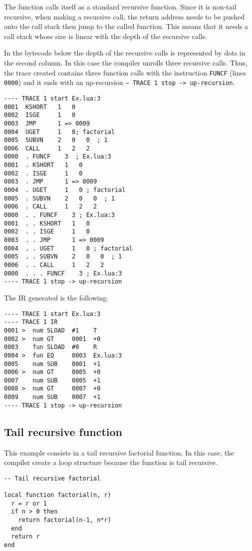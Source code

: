 \noindent
The function calls itself as a standard recursive function. Since it is non-tail recursive, when making a recursive call, the return address needs to be pushed onto the call stack then jump to the called function. This means that it needs a call stack whose size is linear with the depth of the recursive calls.

In the bytecode below the depth of the recursive calls is represented by dots in the second column. In this case the compiler unrolls three recursive calls. Thus, the trace created contains three function calls with the instruction \texttt{FUNCF} (lines \texttt{0000}) and it ends with an up-recursion \texttt{-- TRACE 1 stop -> up-recursion}.
\begin{multicols}{2}
\begin{lstlisting}[style=DumpStyle]
---- TRACE 1 start Ex.lua:3
0001  KSHORT   1   0
0002  ISGE     1   0
0003  JMP      1 => 0009
0004  UGET     1   0; factorial
0005  SUBVN    2   0   0  ; 1
0006  CALL     1   2   2
0000  . FUNCF    3  ; Ex.lua:3
0001  . KSHORT   1   0
0002  . ISGE     1   0
0003  . JMP      1 => 0009
0004  . UGET     1   0 ; factorial
0005  . SUBVN    2   0   0  ; 1
0006  . CALL     1   2   2
0000  . . FUNCF    3 ; Ex.lua:3
0001  . . KSHORT   1   0
0002  . . ISGE     1   0
0003  . . JMP      1 => 0009
0004  . . UGET     1   0 ; factorial
0005  . . SUBVN    2   0   0  ; 1
0006  . . CALL     1   2   2
0000  . . . FUNCF    3 ; Ex.lua:3
---- TRACE 1 stop -> up-recursion
\end{lstlisting}
\end{multicols}

\noindent
The IR generated is the following.

\begin{multicols}{2}
\begin{lstlisting}[style=DumpStyle]
---- TRACE 1 start Ex.lua:3
---- TRACE 1 IR
0001 >  num SLOAD  #1    T
0002 >  num GT     0001  +0  
0003    fun SLOAD  #0    R
0004 >  fun EQ     0003  Ex.lua:3
0005    num SUB    0001  +1  
0006 >  num GT     0005  +0  
0007    num SUB    0005  +1  
0008 >  num GT     0007  +0  
0009    num SUB    0007  +1  
---- TRACE 1 stop -> up-recursion
\end{lstlisting}
\end{multicols}

\subsection{Tail recursive function}
This example consists in a tail recursive factorial function. In this case, the compiler create a loop structure because the function is tail recursive.
\begin{mdframed}[style=LuaStyleFrame]
\begin{lstlisting}[style=LuaStyle]
-- Tail recursive factorial

local function factorial(n, r)
  r = r or 1
  if n > 0 then
    return factorial(n-1, n*r)
  end
  return r
end
\end{lstlisting}
\end{mdframed}

